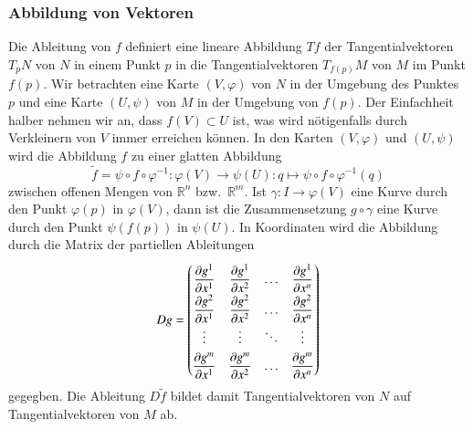 \subsubsection{Abbildung von Vektoren}
Die Ableitung von $f$ definiert eine lineare Abbildung $Tf$ der
Tangentialvektoren $T_pN$ von $N$ in einem Punkt $p$ in die
Tangentialvektoren $T_{f(p)}M$ von $M$ im Punkt $f(p)$.
Wir betrachten eine Karte $(V,\varphi)$ von $N$ in der Umgebung des Punktes
$p$ und eine Karte $(U,\psi)$ von $M$ in der Umgebung von $f(p)$.
Der Einfachheit halber nehmen wir an, dass $f(V)\subset U$ ist, was wird
nötigenfalls durch Verkleinern von $V$ immer erreichen können.
In den Karten $(V,\varphi)$ und $(U,\psi)$ wird die Abbildung
$f$ zu einer glatten Abbildung
\[
\tilde{f}
=
\psi\circ f\circ\varphi^{-1}
\colon
\varphi(V)\to\psi(U)
:
q\mapsto \psi\circ f\circ \varphi^{-1}(q)
\]
zwischen offenen Mengen von $\mathbb{R}^n$ bzw.~$\mathbb{R}^m$.
Ist $\gamma\colon I\to \varphi(V)$ eine Kurve durch den Punkt $\varphi(p)$
in $\varphi(V)$, dann ist die Zusammensetzung $g\circ \gamma$
eine Kurve durch den Punkt $\psi(f(p))$ in $\psi(U)$.
In Koordinaten wird die Abbildung durch die Matrix der partiellen
Ableitungen
\[
Dg
=
\renewcommand\arraystretch{2.0}
\begin{pmatrix}
 \displaystyle\frac{\partial g^1}{\partial x^1}
&\displaystyle\frac{\partial g^1}{\partial x^2}
&\dots&
 \displaystyle\frac{\partial g^1}{\partial x^n}
\\
 \displaystyle\frac{\partial g^2}{\partial x^1}
&\displaystyle\frac{\partial g^2}{\partial x^2}
&\dots&
 \displaystyle\frac{\partial g^2}{\partial x^n}
\\[-1pt]
\vdots&\vdots&\ddots&\vdots
\\[-3pt]
 \displaystyle\frac{\partial g^m}{\partial x^1}
&\displaystyle\frac{\partial g^m}{\partial x^2}
&\dots&
 \displaystyle\frac{\partial g^m}{\partial x^n}
\end{pmatrix}
\]
gegegben.
Die Ableitung $D\tilde{f}$ bildet damit Tangentialvektoren von $N$
auf Tangentialvektoren von $M$ ab.

%
%

